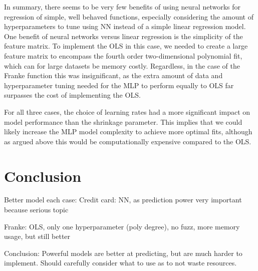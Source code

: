 \documentclass[a4paper, 11pt, twocolumn]{article}
\begin{document}
In summary, there seems to be very few benefits of using neural networks for 
regression of simple, well behaved functions, especially considering the amount 
of hyperparameters to tune using NN instead of a simple linear regression model.
One benefit of neural networks versus linear regression is the simplicity of the 
feature matrix. To implement the OLS in this case, we needed to create a large 
feature matrix to encompass the fourth order two-dimensional polynomial fit, 
which can for large datasets be memory costly. Regardless, in the case of the 
Franke function this was insignificant,  as the extra amount of data and 
hyperparameter tuning needed for the MLP to perform equally to OLS far surpasses 
the cost of implementing the OLS. 

For all three cases, the choice of learning rates had a more significant impact 
on model performance than the shrinkage parameter. This implies that we could 
likely increase the MLP model complexity to achieve more optimal fits, although as 
argued above this would be computationally expensive compared to the OLS. 


\section{Conclusion}
Better model each case:
Credit card:
NN, as prediction power very important because serious topic

Franke:
OLS, only one hyperparameter (poly degree), no fuzz, more memory usage, but still better

Conclusion:
Powerful models are better at predicting, but are much harder to implement.
Should carefully consider what to use as to not waste resources.
%

\end{document}
